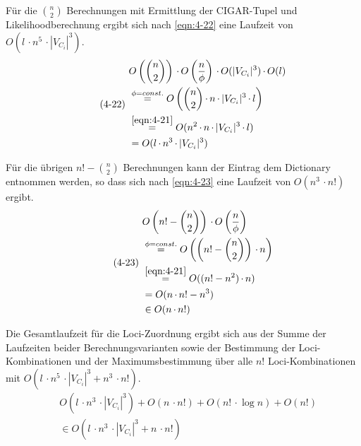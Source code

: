 Für die $\binom{n}{2}$ Berechnungen mit Ermittlung der CIGAR-Tupel und Likelihoodberechnung ergibt sich nach \eqref{eqn:4-22} eine Laufzeit von $ O( l\, \cdotp n^5  \, \cdotp |V_{C_{i}}|^3) $.
\begin{equation} \label{eqn:4-22}
\tag{4-22}
\begin{aligned}
&\ {} O\left( \binom{n}{2}\right)  \, \cdotp O\left(\frac{n}{\phi} \right) \, \cdotp O(|V_{C_{i}}|^3) \, \cdotp O(l)  \\
&\ \stackrel{\phi = const.}{=} O\left( \binom{n}{2} \, \cdotp n \, \cdotp |V_{C_{i}}|^3 \, \cdotp l \right) \\
&\ \stackrel{\eqref{eqn:4-21}}{=} O( n^2 \, \cdotp n \, \cdotp |V_{C_{i}}|^3 \, \cdotp l) \\
&\ = O( l\, \cdotp n^3  \, \cdotp |V_{C_{i}}|^3)\\
\end{aligned}
\end{equation}

Für die übrigen $n! - \binom{n}{2}$ Berechnungen kann der Eintrag dem Dictionary entnommen werden, so dass sich nach \eqref{eqn:4-23} eine Laufzeit von $O(n^3  \, \cdotp n!)$ ergibt.
\begin{equation} \label{eqn:4-23}
\tag{4-23}
\begin{aligned}
&\ {} O\left( n! - \binom{n}{2}\right)  \, \cdotp O\left(\frac{n}{\phi} \right)  \\
&\ \stackrel{\phi = const.}{=} O\left( \left( n! - \binom{n}{2}\right)  \, \cdotp n \right)\\
&\ \stackrel{\eqref{eqn:4-21}}{=} O((n! - n^2)  \, \cdotp n )\\
&\ = O( n \, \cdotp n! - n^3)\\
&\ \in O(n  \, \cdotp n!)\\
\end{aligned}
\end{equation}

Die Gesamtlaufzeit für die Loci-Zuordnung ergibt sich aus der Summe der Laufzeiten beider Berechnungsvarianten sowie der Bestimmung der Loci-Kombinationen und der Maximumsbestimmung über alle $n!$ Loci-Kombinationen mit $O( l\, \cdotp n^5  \, \cdotp |V_{C_{i}}|^3 + n^3  \, \cdotp n!)$. 
\begin{equation} \label{eqn:4-24}
\tag{4-24}
\begin{aligned}
&\ {} O( l\, \cdotp n^3  \, \cdotp |V_{C_{i}}|^3) + O(n  \, \cdotp n!) + O(n ! \, \cdotp \log n) + O(n!) \\
&\ \in O( l\, \cdotp n^3  \, \cdotp |V_{C_{i}}|^3 + n  \, \cdotp n!)
\end{aligned}
\end{equation}

